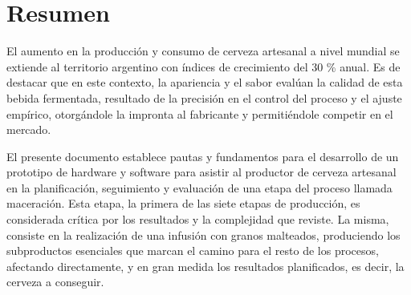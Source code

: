 
\afterpage{\null\newpage}
\newpage
\chapter*{Resumen}
\par
    El aumento en la producción y consumo de cerveza artesanal a nivel mundial se extiende al territorio argentino con índices de crecimiento del 30 \% anual. Es de destacar que en este contexto, la apariencia y el sabor evalúan la calidad de esta bebida fermentada, resultado de la precisión en el control del proceso y el ajuste empírico, otorgándole la impronta al fabricante y permitiéndole competir en el mercado.
\par
    El presente documento establece pautas y fundamentos para el desarrollo de un prototipo de hardware y software para asistir al productor de cerveza artesanal en la planificación, seguimiento y evaluación de una etapa del proceso llamada maceración. Esta etapa, la primera de las siete etapas de producción, es considerada crítica por los resultados y la complejidad que reviste. La misma, consiste en la realización de una infusión con granos malteados, produciendo los subproductos esenciales que marcan el camino para el resto de los procesos, afectando directamente, y en gran medida los resultados planificados, es decir, la cerveza a conseguir.
